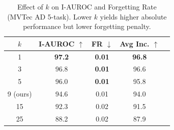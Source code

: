 \begin{table}[htbp]
\centering
\caption{Effect of $k$ on I-AUROC and Forgetting Rate (MVTec AD 5-task). Lower $k$ yields higher absolute performance but lower forgetting penalty.}
\label{tab:k_ablation}
\begin{tabular}{ccccc}
\toprule
$k$ & I-AUROC $\uparrow$ & FR $\downarrow$ & Avg Inc. $\uparrow$ \\
\midrule
1 & \textbf{97.2} & \textbf{0.01} & \textbf{96.8} \\
3 & 96.8 & \textbf{0.01} & 96.6 \\
5 & 96.0 & \textbf{0.01} & 95.8 \\
9 (ours) & 94.6 & 0.01 & 94.0 \\
15 & 92.3 & 0.02 & 91.5 \\
25 & 88.2 & 0.02 & 87.9 \\
\bottomrule
\end{tabular}
\end{table}
